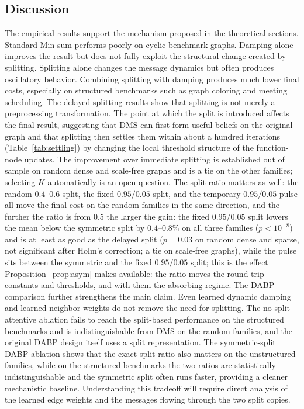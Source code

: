 \subsection{Discussion}
The empirical results support the mechanism proposed in the theoretical
sections.  Standard Min-sum performs poorly on cyclic benchmark graphs.
Damping alone improves the result but does not fully exploit the structural
change created by splitting.  Splitting alone changes the message dynamics but
often produces oscillatory behavior.  Combining splitting with damping produces
much lower final costs, especially on structured benchmarks such as graph
coloring and meeting scheduling.
The delayed-splitting results show that splitting is not merely a preprocessing
transformation.  The point at which the split is introduced affects the final
result, suggesting that DMS can first form useful beliefs on the original graph
and that splitting then settles them within about a hundred iterations
(Table~\ref{tab:settling}) by changing the local threshold structure of the
function-node updates.  The improvement over immediate splitting is
established out of sample on random dense and scale-free graphs and is a
tie on the other families; selecting $K$ automatically is an open question.
The split ratio matters as well: the random $0.4$--$0.6$ split, the fixed
$0.95/0.05$ split, and the temporary $0.95/0.05$ pulse all move the final
cost on the random families in the same direction, and the further the ratio
is from $0.5$ the larger the gain: the fixed $0.95/0.05$ split lowers the
mean below the symmetric split by $0.4$--$0.8\%$ on all three families
($p < 10^{-8}$) and is at least as good as the delayed split ($p = 0.03$
on random dense and sparse, not significant after Holm's correction; a tie
on scale-free graphs), while the pulse
sits between the symmetric and the fixed $0.95/0.05$ split; this is the effect
Proposition~\ref{prop:asym} makes available: the ratio moves the round-trip
constants and thresholds, and with them the absorbing regime.
The DABP comparison further strengthens the main claim.  Even learned dynamic
damping and learned neighbor weights do not remove the need for splitting.  The
no-split attentive ablation fails to reach the split-based performance on the
structured benchmarks and is indistinguishable from DMS on the random
families, and the original DABP design itself uses a split representation.  The symmetric-split DABP ablation shows that the exact split
ratio also matters on the unstructured families, while on the structured
benchmarks the two ratios are statistically indistinguishable and the symmetric
split often runs faster, providing a cleaner mechanistic baseline.
Understanding this tradeoff will require direct analysis of the learned edge
weights and the messages flowing through the two split copies.
